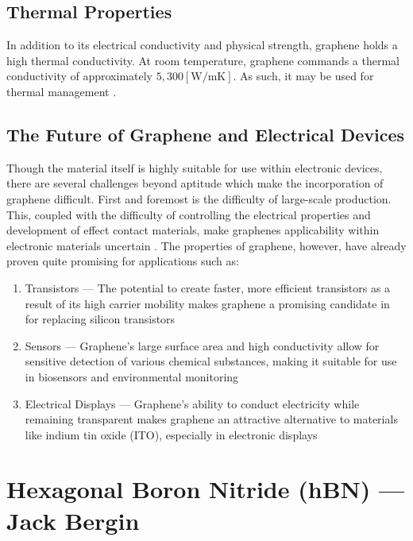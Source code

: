 \documentclass[conference]{IEEEtran}
\begin{document}
\subsection{Thermal Properties}

In addition to its electrical conductivity and physical strength, graphene holds a high thermal conductivity. At room temperature, graphene commands a thermal conductivity of approximately $5,300[\si{\watt\per\milli\kelvin}]$. As such, it may be used for thermal management \cite{mb7}.

\subsection{The Future of Graphene and Electrical Devices}

Though the material itself is highly suitable for use within electronic devices, there are several challenges beyond aptitude which make the incorporation of graphene difficult. First and foremost is the difficulty of large-scale production. This, coupled with the difficulty of controlling the electrical properties and development of effect contact materials, make graphenes applicability within electronic materials uncertain \cite{mb8}. The properties of graphene, however, have already proven quite promising for applications such as:

\begin{enumerate}

  \item Transistors — The potential to create faster, more efficient transistors as a result of its high carrier mobility makes graphene a promising candidate in for replacing silicon transistors

  \item Sensors — Graphene's large surface area and high conductivity allow for sensitive detection of various chemical substances, making it suitable for use in biosensors and environmental monitoring

  \item Electrical Displays — Graphene's ability to conduct electricity while remaining transparent makes graphene an attractive alternative to materials like indium tin oxide (ITO), especially in electronic displays

\end{enumerate}

\section{Hexagonal Boron Nitride (hBN) — Jack Bergin}
\end{document}
